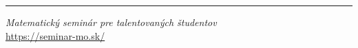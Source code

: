 \printbibliography

\vfill
\noindent\rule{\textwidth}{1pt}
\textit{Matematický seminár pre talentovaných študentov}\\
\url{https://seminar-mo.sk/}

